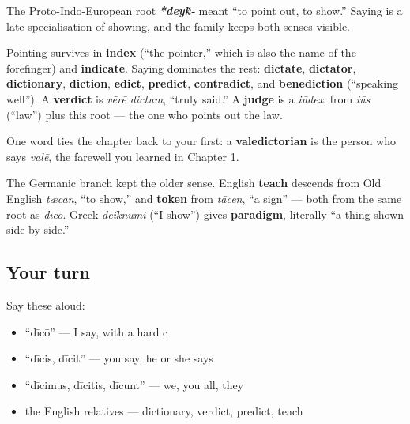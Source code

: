 \begin{cousinweb}
The Proto-Indo-European root \emph{\textbf{*dey\'{k}-}} meant \textquotedblleft{}to point out, to show.\textquotedblright{} Saying is a late specialisation of showing, and the family keeps both senses visible.

Pointing survives in \textbf{index} (\textquotedblleft{}the pointer,\textquotedblright{} which is also the name of the forefinger) and \textbf{indicate}. Saying dominates the rest: \textbf{dictate}, \textbf{dictator}, \textbf{dictionary}, \textbf{diction}, \textbf{edict}, \textbf{predict}, \textbf{contradict}, and \textbf{benediction} (\textquotedblleft{}speaking well\textquotedblright{}). A \textbf{verdict} is \emph{vērē dictum}, \textquotedblleft{}truly said.\textquotedblright{} A \textbf{judge} is a \emph{iūdex}, from \emph{iūs} (\textquotedblleft{}law\textquotedblright{}) plus this root — the one who points out the law.

One word ties the chapter back to your first: a \textbf{valedictorian} is the person who says \emph{valē}, the farewell you learned in Chapter 1.

The Germanic branch kept the older sense. English \textbf{teach} descends from Old English \emph{tæcan}, \textquotedblleft{}to show,\textquotedblright{} and \textbf{token} from \emph{tācen}, \textquotedblleft{}a sign\textquotedblright{} — both from the same root as \emph{dīcō}. Greek \emph{deíknumi} (\textquotedblleft{}I show\textquotedblright{}) gives \textbf{paradigm}, literally \textquotedblleft{}a thing shown side by side.\textquotedblright{}
\end{cousinweb}

\subsection*{Your turn}
Say these aloud:

\begin{itemize}
\raggedright
  \item \textquotedblleft{}dīcō\textquotedblright{} — I say, with a hard c
  \item \textquotedblleft{}dīcis, dīcit\textquotedblright{} — you say, he or she says
  \item \textquotedblleft{}dīcimus, dīcitis, dīcunt\textquotedblright{} — we, you all, they
  \item the English relatives — dictionary, verdict, predict, teach
\end{itemize}

